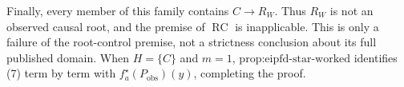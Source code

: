 Finally, every member of this family contains \(C\to R_W\).  Thus \(R_W\) is not an observed causal root, and the premise of \(\operatorname{RC}\) is inapplicable.  This is only a failure of the root-control premise, not a strictness conclusion about its full published domain.  When \(H=\{C\}\) and \(m=1\), \(\text{prop:eipfd-star-worked}\) identifies (7) term by term with \(f_a^\star(P_{\mathrm{obs}})(y)\), completing the proof.